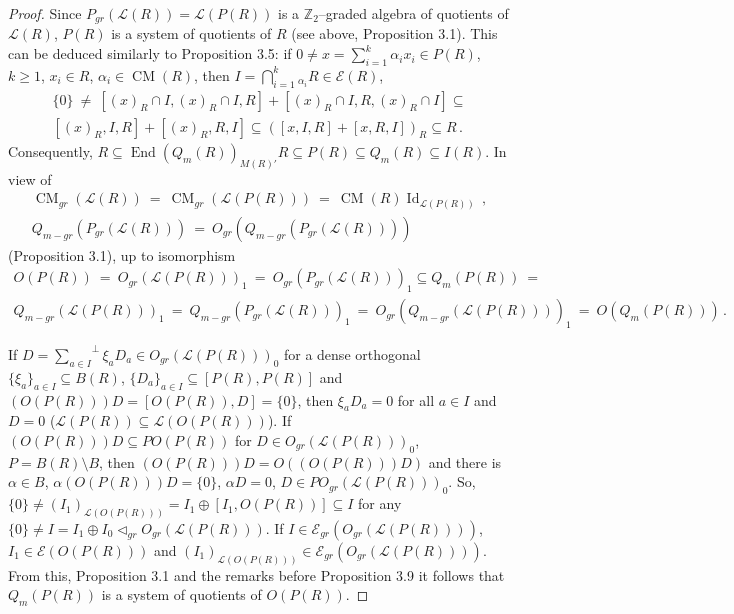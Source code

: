 \documentclass[a4paper,11pt]{article}
\DeclareMathOperator{\Id}{Id}
\DeclareMathOperator{\End}{End}
\DeclareMathOperator{\CM}{CM}
\begin{document}
\begin{proof}
Since ${P_{gr}(\mathcal{L}(R))=\mathcal{L}(P(R))}$ is a $\mathbb{Z}_2$--graded 
algebra of quotients of $\mathcal{L}(R)$, $P(R)$ is a system of quotients of 
$R$ (see above, Proposition 3.1). This can be deduced similarly to 
Proposition 3.5: if ${0\ne x=\sum\limits_{i=1}^k \alpha_i x_i\in P(R)}$, 
${k\geq 1}$, ${x_i\in R}$, ${\alpha_i\in \CM(R)}$, then 
${I=\bigcap\limits_{i=1}^k {}_{\alpha_i} R\in \mathcal{E}(R)}$, 
\begin{multline*}
\{0\}\ \ne\ 
[(x)_R\cap I, (x)_R\cap I, R]+[(x)_R\cap I, R, (x)_R\cap I]\subseteq
\\ 
[(x)_R, I, R]+[(x)_R, R, I]\subseteq ([x, I, R]+[x, R, I])_R\subseteq R\,.
\end{multline*}
Consequently, ${R\subseteq \End(Q_m(R))_{M(R)'} R\subseteq 
P(R)\subseteq Q_m(R)\subseteq I(R)}$. In view of 
\begin{gather*}
\CM_{gr}(\mathcal{L}(R))\ =\ \CM_{gr}(\mathcal{L}(P(R)))\ =\ \CM(R) 
\Id_{\mathcal{L}(P(R))}\,,
\\
Q_{m-gr}(P_{gr}(\mathcal{L}(R)))\ =\ O_{gr}(Q_{m-gr}(P_{gr}(\mathcal{L}(R))))
\end{gather*}
(Proposition 3.1), up to isomorphism  
\begin{multline*}
O(P(R))\ =\  
O_{gr}(\mathcal{L}(P(R)))_1\ =\ O_{gr}(P_{gr}(\mathcal{L}(R)))_1\subseteq 
Q_m(P(R))\ =
\\ 
Q_{m-gr}(\mathcal{L}(P(R)))_1\ =\ Q_{m-gr}(P_{gr}(\mathcal{L}(R)))_1\ =\ 
O_{gr}(Q_{m-gr}(\mathcal{L}(P(R))))_1\ =\ O(Q_m(P(R)))\,.
\end{multline*}

If ${D={\sum\limits_{a\in I}}^{\perp} \xi_a D_a\in O_{gr}(\mathcal{L}(P(R)))_0}$
for a dense orthogonal ${\{\xi_a\}_{a\in I}\subseteq B(R)}$, 
$\{D_a\}_{a\in I}\subseteq [P(R), P(R)]$ and 
${(O(P(R)))D=[O(P(R)), D]=\{0\}}$, then ${\xi_a D_a=0}$ for all ${a\in I}$ and 
${D=0}$ (${\mathcal{L}(P(R))\subseteq \mathcal{L}(O(P(R)))}$). If 
${(O(P(R)))D\subseteq P O(P(R))}$ for ${D\in O_{gr}(\mathcal{L}(P(R)))_0}$, 
$P=B(R)\setminus B$, then ${(O(P(R)))D=O((O(P(R)))D)}$ and there is 
${\alpha\in B}$, ${\alpha (O(P(R)))D=\{0\}}$, ${\alpha D=0}$, 
${D\in P O_{gr}(\mathcal{L}(P(R)))_0}$. So, 
${\{0\}\ne (I_1)_{\mathcal{L}(O(P(R)))}=I_1\oplus [I_1, O(P(R))]\subseteq I}$ 
for any $\{0\}\ne I=I_1\oplus I_0\lhd_{gr} O_{gr}(\mathcal{L}(P(R)))$. 
If ${I\in \mathcal{E}_{gr}(O_{gr}(\mathcal{L}(P(R))))}$,  
${I_1\in \mathcal{E}(O(P(R)))}$ and 
$(I_1)_{\mathcal{L}(O(P(R)))}\in \mathcal{E}_{gr}(O_{gr}(\mathcal{L}(P(R))))$. 
From this, Proposition 3.1 and the remarks before Proposition 3.9 it follows 
that $Q_m(P(R))$ is a system of quotients of $O(P(R))$. 


\end{proof}
\end{document}
